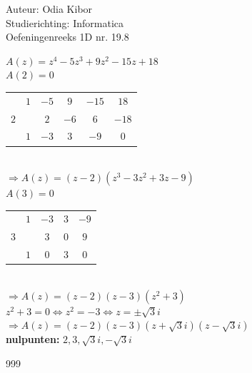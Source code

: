 \documentclass[a4paper]{article}
\begin{document}
  
\noindent \large Auteur: Odia Kibor \\
\noindent \large Studierichting: Informatica\\
\noindent \large Oefeningenreeks 1D nr. 19.8\\

\medskip

\normalsize

$A(z) = z^4 - 5z^3 + 9z^2 - 15z + 18$\\

$A(2) = 0$\\

\begin{tabular}{c|ccccc}
		& $1$ & $-5$ & $9$ & $-15$ & $18$\\
$2$ 	&     & $2$  & $-6$ & $6$  & $-18$\\ \hline
		& $1$ & $-3$ & $3$  & $-9$ & $0$\\
\end{tabular}\\

$\Rightarrow A(z) = (z - 2)(z^3 - 3z^2 + 3z -9)$\\

$A(3) = 0$\\

\begin{tabular}{c|cccc}
		& $1$ & $-3$ & $3$ & $-9$\\
$3$ 	&     & $3$  & $0$ & $9$ \\ \hline
		& $1$ & $0$ & $3$  & $0$\\
\end{tabular}\\

$\Rightarrow A(z) = (z - 2)(z - 3)(z^2 + 3)$\\

$z^2 + 3 = 0 \Leftrightarrow z^2 = -3 \Leftrightarrow z = \pm \sqrt{3}i$\\

$\Rightarrow A(z) = (z - 2)(z - 3)(z + \sqrt{3}i)(z - \sqrt{3}i)$\\

\textbf{nulpunten:} $2, 3, \sqrt{3}i, -\sqrt{3}i$








\begin{thebibliography}{999}
\end{thebibliography}
\end{document}
